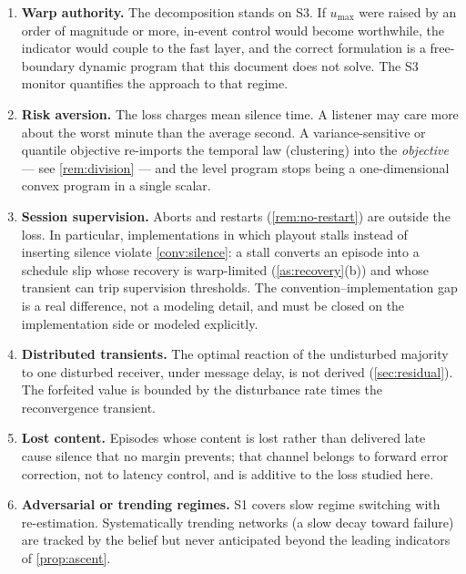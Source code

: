 \documentclass[11pt, a4paper]{article}
\theoremstyle{definition}
\theoremstyle{plain}
\theoremstyle{remark}
\begin{document}
\begin{enumerate}[label=(L\arabic*)]
  \item \textbf{Warp authority.}  The decomposition stands on S3.  If
    $u_{\max}$ were raised by an order of magnitude or more, in-event
    control would become worthwhile, the indicator would couple to the
    fast layer, and the correct formulation is a free-boundary dynamic
    program that this document does not solve.  The S3 monitor
    quantifies the approach to that regime.
  \item \textbf{Risk aversion.}  The loss charges mean silence time.
    A listener may care more about the worst minute than the average
    second.  A variance-sensitive or quantile objective re-imports the
    temporal law (clustering) into the \emph{objective} --- see
    \cref{rem:division} --- and the level program stops being a
    one-dimensional convex program in a single scalar.
  \item \textbf{Session supervision.}  Aborts and restarts
    (\cref{rem:no-restart}) are outside the loss.  In particular,
    implementations in which playout stalls instead of inserting
    silence violate \cref{conv:silence}: a stall converts an episode
    into a schedule slip whose recovery is warp-limited
    (\cref{as:recovery}(b)) and whose transient can trip supervision
    thresholds.  The convention--implementation gap is a real
    difference, not a modeling detail, and must be closed on the
    implementation side or modeled explicitly.
  \item \textbf{Distributed transients.}  The optimal reaction of the
    undisturbed majority to one disturbed receiver, under message
    delay, is not derived (\cref{sec:residual}).  The forfeited value
    is bounded by the disturbance rate times the reconvergence
    transient.
  \item \textbf{Lost content.}  Episodes whose content is lost rather
    than delivered late cause silence that no margin prevents; that
    channel belongs to forward error correction, not to latency
    control, and is additive to the loss studied here.
  \item \textbf{Adversarial or trending regimes.}  S1 covers slow
    regime switching with re-estimation.  Systematically trending
    networks (a slow decay toward failure) are tracked by the belief
    but never anticipated beyond the leading indicators of
    \cref{prop:ascent}.
\end{enumerate}

\appendix
\end{document}
